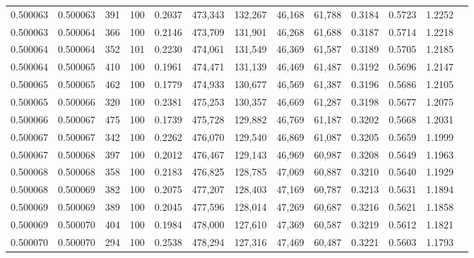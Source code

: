 \begin{tabular}{rrrrrrrrrrrrr}
0.500063 & 0.500063 &   391 & 100 &                                     0.2037 & 473,343 & 132,267 &  46,168 &  61,788 & 0.3184 & 0.5723 & 1.2252 \\
0.500063 & 0.500064 &   366 & 100 &                                     0.2146 & 473,709 & 131,901 &  46,268 &  61,688 & 0.3187 & 0.5714 & 1.2218 \\
0.500064 & 0.500064 &   352 & 101 &                                     0.2230 & 474,061 & 131,549 &  46,369 &  61,587 & 0.3189 & 0.5705 & 1.2185 \\
0.500064 & 0.500065 &   410 & 100 &                                     0.1961 & 474,471 & 131,139 &  46,469 &  61,487 & 0.3192 & 0.5696 & 1.2147 \\
0.500065 & 0.500065 &   462 & 100 &                                     0.1779 & 474,933 & 130,677 &  46,569 &  61,387 & 0.3196 & 0.5686 & 1.2105 \\
0.500065 & 0.500066 &   320 & 100 &                                     0.2381 & 475,253 & 130,357 &  46,669 &  61,287 & 0.3198 & 0.5677 & 1.2075 \\
0.500066 & 0.500067 &   475 & 100 &                                     0.1739 & 475,728 & 129,882 &  46,769 &  61,187 & 0.3202 & 0.5668 & 1.2031 \\
0.500067 & 0.500067 &   342 & 100 &                                     0.2262 & 476,070 & 129,540 &  46,869 &  61,087 & 0.3205 & 0.5659 & 1.1999 \\
0.500067 & 0.500068 &   397 & 100 &                                     0.2012 & 476,467 & 129,143 &  46,969 &  60,987 & 0.3208 & 0.5649 & 1.1963 \\
0.500068 & 0.500068 &   358 & 100 &                                     0.2183 & 476,825 & 128,785 &  47,069 &  60,887 & 0.3210 & 0.5640 & 1.1929 \\
0.500068 & 0.500069 &   382 & 100 &                                     0.2075 & 477,207 & 128,403 &  47,169 &  60,787 & 0.3213 & 0.5631 & 1.1894 \\
0.500069 & 0.500069 &   389 & 100 &                                     0.2045 & 477,596 & 128,014 &  47,269 &  60,687 & 0.3216 & 0.5621 & 1.1858 \\
0.500069 & 0.500070 &   404 & 100 &                                     0.1984 & 478,000 & 127,610 &  47,369 &  60,587 & 0.3219 & 0.5612 & 1.1821 \\
0.500070 & 0.500070 &   294 & 100 &                                     0.2538 & 478,294 & 127,316 &  47,469 &  60,487 & 0.3221 & 0.5603 & 1.1793 \\

\end{tabular}
